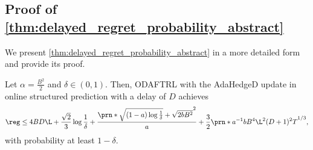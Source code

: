 \subsection{Proof of \cref{thm:delayed_regret_probability_abstract}}
\label{app:sub_delayed_regret_probability_abstract}
We present \cref{thm:delayed_regret_probability_abstract} in a more detailed form and provide its proof. 
\begin{theorem}
    \label{thm:delayed_regret_probability_abstract_detail}
    Let $\alpha=\frac{B^2}{2}$ and $\delta \in (0,1)$.
    Then, 
    ODAFTRL with the AdaHedgeD update in online structured prediction with a delay of $D$ achieves
    \begin{equation*}
        \reg\leq 4BD\L+\frac{\sqrt{2}}{3}\log\frac{1}{\delta}
        +\frac{\prn*{\sqrt{(1-a)\log\frac{1}{\delta}}+\sqrt{2bB^2}}^2}{a}
        +\frac{3}{2}\prn*{a^{-1}bB^4\L^2(D+1)^2T}^{1/3},
    \end{equation*}
    with probability at least $1 - \delta$. 
\end{theorem}

